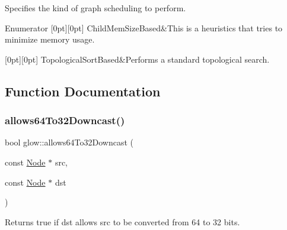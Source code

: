 Specifies the kind of graph scheduling to perform. 

\begin{DoxyEnumFields}{Enumerator}
[0pt][0pt]{}\mbox{\label{namespaceglow_af5b11a9c44f948717d6a886891a58b11aca8f7fd5d3a60fdbaaa2f584621c7759}} 
Child\+Mem\+Size\+Based&This is a heuristics that tries to minimize memory usage. \\
\hline

[0pt][0pt]{}\mbox{\label{namespaceglow_af5b11a9c44f948717d6a886891a58b11afc2c746e636936c8ce50270012da3147}} 
Topological\+Sort\+Based&Performs a standard topological search. \\
\hline

\end{DoxyEnumFields}


\subsection{Function Documentation}
\mbox{\label{namespaceglow_a9052142cd801c37c1dd49a3b139682d9}} 
\subsubsection{\texorpdfstring{allows64\+To32\+Downcast()}{allows64To32Downcast()}\hspace{0.1cm}{\footnotesize\ttfamily [1/2]}}
{\footnotesize\ttfamily bool glow\+::allows64\+To32\+Downcast (\begin{DoxyParamCaption}\item[{const \hyperlink{classglow_1_1_node}{Node} $\ast$}]{src,  }\item[{const \hyperlink{classglow_1_1_node}{Node} $\ast$}]{dst }\end{DoxyParamCaption})}

\begin{DoxyReturn}{Returns}
true if {\ttfamily dst} allows {\ttfamily src} to be converted from 64 to 32 bits. 
\end{DoxyReturn}
\mbox{\label{namespaceglow_ac2c06e353dbcd4a5d2af024633fdaadb}} 
